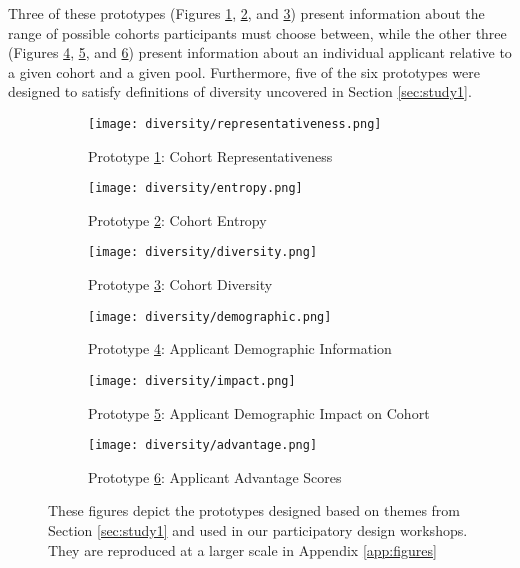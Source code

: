 Three of these prototypes (Figures \ref{fig:representativeness}, \ref{fig:entropy}, and \ref{fig:diversity}) present information about the range of possible cohorts participants must choose between, while the other three (Figures \ref{fig:demographic}, \ref{fig:impact}, and \ref{fig:advantage}) present information about an individual applicant relative to a given cohort and a given pool. Furthermore, five of the six prototypes were designed to satisfy definitions of diversity uncovered in Section \ref{sec:study1}.

\begin{figure}[htbp]
    \centering
    \begin{subfigure}[b]{0.33\textwidth}
        \texttt{[image: diversity/representativeness.png]}
        \caption{Prototype \ref{fig:representativeness}: Cohort Representativeness}
        \label{fig:representativeness}
    \end{subfigure}
    \hfill
    \begin{subfigure}[b]{0.33\textwidth}
        \texttt{[image: diversity/entropy.png]}
        \caption{Prototype \ref{fig:entropy}: Cohort Entropy}
        \label{fig:entropy}
    \end{subfigure}
    \hfill
    \begin{subfigure}[b]{0.33\textwidth}
        \texttt{[image: diversity/diversity.png]}
        \caption{Prototype \ref{fig:diversity}: Cohort Diversity}
        \label{fig:diversity}
    \end{subfigure}

    \medskip

    \begin{subfigure}[b]{0.3\textwidth}
        \texttt{[image: diversity/demographic.png]}
        \caption{Prototype \ref{fig:demographic}: Applicant Demographic Information}
        \label{fig:demographic}
    \end{subfigure}
    \hfill
    \begin{subfigure}[b]{0.3\textwidth}
        \texttt{[image: diversity/impact.png]}
        \caption{Prototype \ref{fig:impact}: Applicant Demographic Impact on Cohort}
        \label{fig:impact}
    \end{subfigure}
    \hfill
    \begin{subfigure}[b]{0.3\textwidth}
        \texttt{[image: diversity/advantage.png]}
        \caption{Prototype \ref{fig:advantage}: Applicant Advantage Scores}
        \label{fig:advantage}
    \end{subfigure}
    \caption{These figures depict the prototypes designed based on themes from Section \ref{sec:study1} and used in our participatory design workshops. They are reproduced at a larger scale in Appendix \ref{app:figures}}
    \label{fig:prototypes}
\end{figure}

